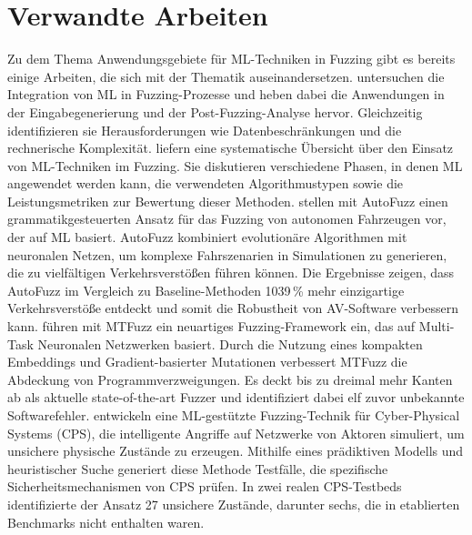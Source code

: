 
\section{Verwandte Arbeiten}\label{sec:related-work}
Zu dem Thema Anwendungsgebiete für ML-Techniken in Fuzzing gibt es bereits einige Arbeiten, die sich mit der Thematik auseinandersetzen.
\citet{saavedra_review_2019} untersuchen die Integration von ML in Fuzzing-Prozesse und heben dabei die Anwendungen in der
Eingabegenerierung und der Post-Fuzzing-Analyse hervor.
Gleichzeitig identifizieren sie Herausforderungen wie Datenbeschränkungen und die rechnerische Komplexität.\newline
\citet{wang_systematic_2020} liefern eine systematische Übersicht über den Einsatz von ML-Techniken im Fuzzing.
Sie diskutieren verschiedene Phasen, in denen ML angewendet werden kann, die verwendeten Algorithmustypen sowie die
Leistungsmetriken zur Bewertung dieser Methoden.\newline
\citet{zhong_neural_2022} stellen mit AutoFuzz einen grammatikgesteuerten Ansatz für das Fuzzing von autonomen Fahrzeugen
vor, der auf ML basiert.
AutoFuzz kombiniert evolutionäre Algorithmen mit neuronalen Netzen, um komplexe Fahrszenarien in Simulationen zu generieren,
die zu vielfältigen Verkehrsverstößen führen können.
Die Ergebnisse zeigen, dass AutoFuzz im Vergleich zu Baseline-Methoden \num{10}\text{--}\num{39}\,\unit{\percent}
mehr einzigartige Verkehrsverstöße entdeckt und somit die Robustheit von AV-Software verbessern kann.\newline
\citet{she_mtfuzz_2020} führen mit MTFuzz ein neuartiges Fuzzing-Framework ein, das auf Multi-Task Neuronalen Netzwerken basiert.
Durch die Nutzung eines kompakten Embeddings und Gradient-basierter Mutationen verbessert MTFuzz die Abdeckung von
Programmverzweigungen.
Es deckt bis zu dreimal mehr Kanten ab als aktuelle state-of-the-art Fuzzer und identifiziert dabei elf zuvor unbekannte
Softwarefehler.\newline
\citet{chen_learning-guided_2019} entwickeln eine ML-gestützte Fuzzing-Technik für Cyber-Physical Systems (CPS), die intelligente
Angriffe auf Netzwerke von Aktoren simuliert, um unsichere physische Zustände zu erzeugen.
Mithilfe eines prädiktiven Modells und heuristischer Suche generiert diese Methode Testfälle, die spezifische
Sicherheitsmechanismen von CPS prüfen.
In zwei realen CPS-Testbeds identifizierte der Ansatz 27 unsichere Zustände, darunter sechs, die in etablierten Benchmarks
nicht enthalten waren.